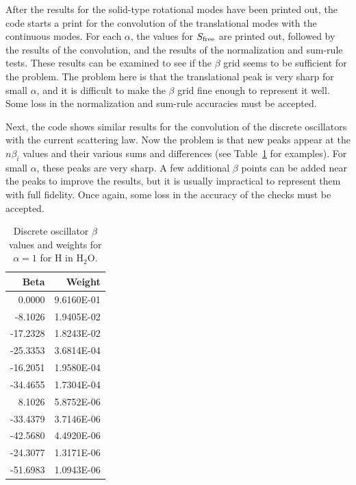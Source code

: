 After the results for the solid-type rotational modes have been printed
out, the code starts a print for the convolution of the translational
modes with the continuous modes.  For each $\alpha$, the values for
$S_{\rm free}$ are printed out, followed by the results of the
convolution, and the results of the normalization and sum-rule tests.
These results can be examined to see if the $\beta$ grid seems to be
sufficient for the problem.  The problem here is that the translational
peak is very sharp for small $\alpha$, and it is difficult to make the
$\beta$ grid fine enough to represent it well.  Some loss in the
normalization and sum-rule accuracies must be accepted.

Next, the code shows similar results for the convolution of the discrete
oscillators with the current scattering law.
Now the problem is that new peaks appear at the $n\beta_i$ values and
their various sums and differences (see Table~\ref{oscwts} for examples).
For small $\alpha$, these peaks are very sharp.  A few additional
$\beta$ points can be added near the peaks to improve the results, but
it is usually impractical to represent them with full fidelity.  Once
again, some loss in the accuracy of the checks must be accepted.

\begin{table}[ht]
\begin{center}
\caption[Oscillator beta values for $\alpha=1$ for H in H$_2$O]{Discrete
 oscillator $\beta$ values and weights for $\alpha=1$ for H in H$_2$O.}
\vspace{3mm}
\label{oscwts}
\hspace{-10mm}\begin{tabular}{rr}
\bf\small Beta & \bf\small Weight \\ \hline
0.0000 & 9.6160E-01 \\
-8.1026 & 1.9405E-02 \\
-17.2328 & 1.8243E-02 \\
-25.3353 & 3.6814E-04 \\
-16.2051 & 1.9580E-04 \\
-34.4655 & 1.7304E-04 \\
8.1026 & 5.8752E-06 \\
-33.4379 & 3.7146E-06 \\
-42.5680 & 4.4920E-06 \\
-24.3077 & 1.3171E-06 \\
-51.6983 & 1.0943E-06 \\ \hline
\end{tabular}
\end{center}
\end{table}


